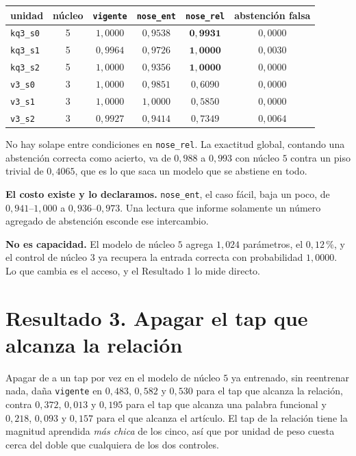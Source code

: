 \documentclass[11pt,a4paper]{article}
\begin{document}
\begin{center}
\begin{tabular}{lccccc}
\toprule
unidad & núcleo & \texttt{vigente} & \texttt{nose\_ent} & \textbf{\texttt{nose\_rel}} & abstención falsa \\
\midrule
\texttt{kq3\_s0} & 5 & $1{,}0000$ & $0{,}9538$ & $\mathbf{0{,}9931}$ & $0{,}0000$ \\
\texttt{kq3\_s1} & 5 & $0{,}9964$ & $0{,}9726$ & $\mathbf{1{,}0000}$ & $0{,}0030$ \\
\texttt{kq3\_s2} & 5 & $1{,}0000$ & $0{,}9356$ & $\mathbf{1{,}0000}$ & $0{,}0000$ \\
\midrule
\texttt{v3\_s0} & 3 & $1{,}0000$ & $0{,}9851$ & $0{,}6090$ & $0{,}0000$ \\
\texttt{v3\_s1} & 3 & $1{,}0000$ & $1{,}0000$ & $0{,}5850$ & $0{,}0000$ \\
\texttt{v3\_s2} & 3 & $0{,}9927$ & $0{,}9414$ & $0{,}7349$ & $0{,}0064$ \\
\bottomrule
\end{tabular}
\end{center}

No hay solape entre condiciones en \texttt{nose\_rel}. La exactitud global, contando una abstención
correcta como acierto, va de $0{,}988$ a $0{,}993$ con núcleo $5$ contra un piso trivial de
$0{,}4065$, que es lo que saca un modelo que se abstiene en todo.

\textbf{El costo existe y lo declaramos.} \texttt{nose\_ent}, el caso fácil, baja un poco, de
$0{,}941$--$1{,}000$ a $0{,}936$--$0{,}973$. Una lectura que informe solamente un número agregado de
abstención esconde ese intercambio.

\textbf{No es capacidad.} El modelo de núcleo $5$ agrega $1{,}024$ parámetros, el $0{,}12\,\%$, y el
control de núcleo $3$ ya recupera la entrada correcta con probabilidad $1{,}0000$. Lo que cambia es el
acceso, y el Resultado 1 lo mide directo.

\section{Resultado 3. Apagar el tap que alcanza la relación}

Apagar de a un tap por vez en el modelo de núcleo $5$ ya entrenado, sin reentrenar nada, daña
\texttt{vigente} en $0{,}483$, $0{,}582$ y $0{,}530$ para el tap que alcanza la relación, contra
$0{,}372$, $0{,}013$ y $0{,}195$ para el tap que alcanza una palabra funcional y $0{,}218$, $0{,}093$
y $0{,}157$ para el que alcanza el artículo. El tap de la relación tiene la magnitud aprendida
\emph{más chica} de los cinco, así que por unidad de peso cuesta cerca del doble que cualquiera de los
dos controles.
\end{document}
